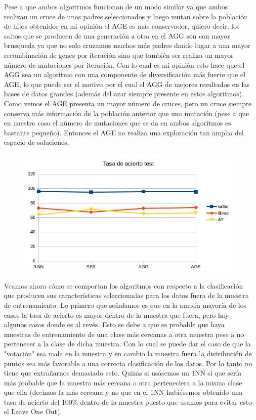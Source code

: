 \documentclass[10pt,a4paper]{article}
\begin{document}
Pese a que ambos algoritmos funcionan de un modo similar ya que ambos realizan un cruce de unos padres seleccionados y luego mutan sobre la población de hijos obtenidos en mi opinión el AGE es más conservador, quiero decir, los saltos que se producen de una generación a otra en el AGG son con mayor brusqueda ya que no solo cruzamos muchos más padres dando lugar a una mayor recombinación de genes por iteración sino que también ser realiza un mayor número de mutaciones por iteración. Con lo cual es mi opinión esto hace que el AGG sea un algoritmo con una componente de diversificación más fuerte que el AGE, lo que puede ser el motivo por el cual el AGG de mejores resultados en las bases de datos grandes (además del azar siempre presente en estos algoritmos).\\

Como vemos el AGE presenta un mayor número de cruces, pero un cruce siempre conserva más información de la población anterior que una mutación (pese a que en nuestro caso el número de mutaciones que se da en ambos algoritmos es bastante pequeño). Entonces el AGE no realiza una exploración tan amplia del espacio de soluciones.\\

\begin{figure}[H]
\centering
\includegraphics[width=130mm]{tasa_test_ag.png}
\end{figure}

Veamos ahora cómo se comportan los algoritmos con respecto a la clasificación que producen sus características seleccionadas para los datos fuera de la muestra de entrenamiento. Lo primero que señalamos es que en la amplia mayoría de los casos la tasa de acierto es mayor dentro de la muestra que fuera, pero hay algunos casos donde es al revés. Esto se debe a que es probable que haya muestras de entrenamiento de una clase más cercanas a otra muestra pese a no pertenecer a la clase de dicha muestra. Con lo cual se puede dar el caso de que la "votación" sea mala en la muestra y en cambio la muestra fuera la distribución de puntos sea más favorable a una correcta clasificación de los datos. Por lo tanto no tiene que extrañarnos demasiado esto. Quizás si usásemos un 1NN sí que sería más probable que la muestra más cercana a otra perteneciera a la misma clase que ella (decimos la más cercana y no que en el 1NN hubiésemos obtenido una tasa de acierto del 100\% dentro de la muestra puesto que usamos para evitar esto el Leave One Out).\\
\end{document}
